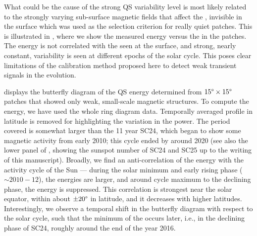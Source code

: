 \documentclass{aa}
\begin{document}
What could be the cause of the strong QS variability level is most likely related to the strongly varying sub-surface magnetic fields that affect the \fffns,
invisible in
the surface \brms{} which was used as the selection criterion for really quiet patches. 
This is illustrated in , where we show the measured \fff energy versus the \brms{} in the patches. The \fff energy is not correlated with the \brms{} seen at the surface, and strong, nearly constant, variability is seen at different epochs of the solar cycle. This poses clear limitations of the calibration method proposed here to detect weak transient signals in the \fff evolution.



 displays the butterfly diagram of the QS
\fff energy determined
from $15\degree \times 15\degree$ patches that showed only weak, small-scale magnetic structures.
To compute the \fff
energy, we have used the whole ring diagram data.
Temporally averaged profile in latitude is removed for highlighting the variation in the
\fff power. The period covered is somewhat larger than the 11 year 
SC24,
which
began to show some magnetic activity from early 2010; this cycle ended by around 2020 (see also the lower panel of , showing the sunspot number of SC24 and SC25 up to the writing of this manuscript).
Broadly, we find an anti-correlation of the \fff 
energy with the activity cycle of the
Sun --- during the solar minimum and early rising phase ($\sim 2010-12$), the \fff
energies
are larger, and around cycle maximum to the declining phase,
the \fff
energy 
is suppressed.
This correlation is strongest near the solar equator, within about $\pm 20\degree$ in
latitude, and it decreases with higher latitudes.
Interestingly, we observe a temporal shift in the \fff butterfly diagram with respect to the
solar cycle, such that the minimum of the \fff occurs later, i.e., in the declining phase of
SC24, roughly around the end of the year 2016.
\end{document}
